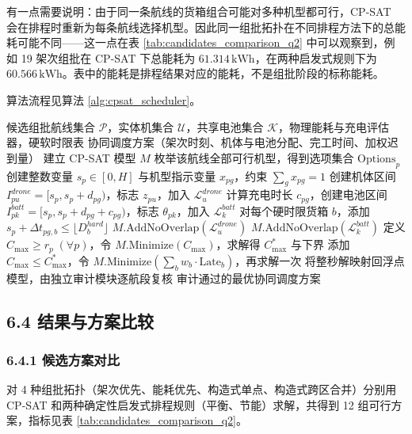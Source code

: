 \documentclass[withoutpreface,bwprint]{format}
\begin{document}
有一点需要说明：由于同一条航线的货箱组合可能对多种机型都可行，CP-SAT 会在排程时重新为每条航线选择机型。因此同一组批拓扑在不同排程方法下的总能耗可能不同——这一点在表 \ref{tab:candidates_comparison_q2} 中可以观察到，例如 19 架次组批在 CP-SAT 下总能耗为 $61.314\,\text{kWh}$，在两种启发式规则下为 $60.566\,\text{kWh}$。表中的能耗是排程结果对应的能耗，不是组批阶段的标称能耗。

算法流程见算法 \ref{alg:cpsat_scheduler}。

\begin{algorithm}[H]
\caption{基于 CP-SAT 的异构无人机与共享电池协同排程算法}
\label{alg:cpsat_scheduler}
\begin{algorithmic}[1]
\Require 候选组批航线集合 $\mathcal{P}$，实体机集合 $\mathcal{U}$，共享电池集合 $\mathcal{K}$，物理能耗与充电评估器，硬软时限表
\Ensure 协同调度方案（架次时刻、机体与电池分配、完工时间、加权迟到量）
\State 建立 CP-SAT 模型 $M$
    \State 枚举该航线全部可行机型，得到选项集合 $\text{Options}_p$
    \State 创建整数变量 $s_p \in [0, H]$ 与机型指示变量 $x_{pg}$，约束 $\sum_{g} x_{pg} = 1$
            \State 创建机体区间 $I_{pu}^{drone} = [s_p, s_p + d_{pg})$，标志 $z_{pu}$，加入 $\mathcal{L}_u^{drone}$
        \EndFor
            \State 计算充电时长 $c_{pg}$，创建电池区间 $I_{pk}^{batt} = [s_p, s_p + d_{pg} + c_{pg})$，标志 $\theta_{pk}$，加入 $\mathcal{L}_k^{batt}$
        \EndFor
        \State 对每个硬时限货箱 $b$，添加 $s_p + \Delta t_{pg,b} \le \lfloor D_b^{hard} \rfloor$
    \EndFor
\EndFor
{}
    \State $M.\text{AddNoOverlap}(\mathcal{L}_u^{drone})$
\EndFor
{}
    \State $M.\text{AddNoOverlap}(\mathcal{L}_k^{batt})$
\EndFor
\State 定义 $C_{\max} \ge r_p \; (\forall p)$，令 $M.\text{Minimize}(C_{\max})$，求解得 $C_{\max}^*$ 与下界
\State 添加 $C_{\max} \le C_{\max}^*$，令 $M.\text{Minimize}(\sum_b w_b \cdot \text{Late}_b)$，再求解一次
\State 将整秒解映射回浮点模型，由独立审计模块逐航段复核
\State \Return 审计通过的最优协同调度方案
\end{algorithmic}
\end{algorithm}

\subsection{6.4 结果与方案比较}

\subsubsection{6.4.1 候选方案对比}
对 4 种组批拓扑（架次优先、能耗优先、构造式单点、构造式跨区合并）分别用 CP-SAT 和两种确定性启发式排程规则（平衡、节能）求解，共得到 12 组可行方案，指标见表 \ref{tab:candidates_comparison_q2}。
\end{document}
